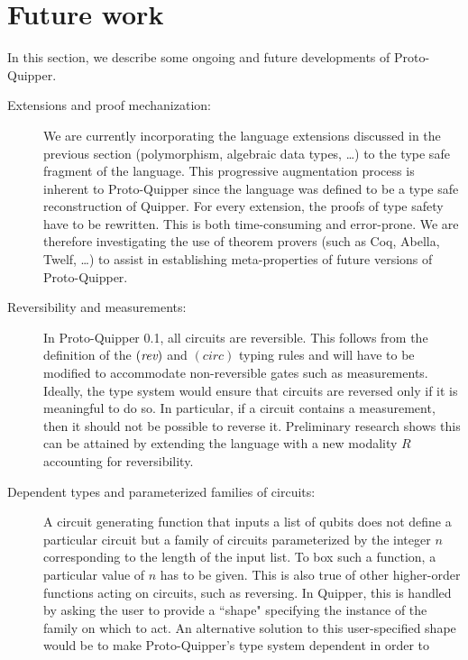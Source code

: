 \documentclass[twoside]{article}
\begin{document}
\clearpage
\section{Future work}

In this section, we describe some ongoing and future developments 
of Proto-Quipper.
\begin{description}
  \item[Extensions and proof mechanization:] We are 
    currently incorporating the language extensions discussed 
    in the previous section (polymorphism, algebraic data types, 
    \ldots) to the type safe fragment of the language. This 
    progressive augmentation process is inherent to Proto-Quipper 
    since the language was defined to be a type safe 
    reconstruction of Quipper. For every extension, the proofs 
    of type safety have to be rewritten. This is both time-consuming 
    and error-prone. We are therefore investigating the use 
    of theorem provers (such as Coq, Abella, Twelf, \ldots) to assist 
    in establishing meta-properties of future versions of 
    Proto-Quipper. 
  \item[Reversibility and measurements:] In Proto-Quipper 
    0.1, all circuits are reversible. This follows from the 
    definition of the $(\mathop{\textit{rev}}\nolimits)$ and $(circ)$ typing rules and will 
    have to be modified to accommodate non-reversible gates such 
    as measurements. Ideally, the type system would ensure that 
    circuits are reversed only if it is meaningful to do so. In 
    particular, if a circuit contains a measurement, then it 
    should not be possible to reverse it. Preliminary research 
    shows this can be attained by extending the language with a 
    new modality $R$ accounting for reversibility. 
  \item[Dependent types and parameterized families of circuits:] 
    A circuit generating function that inputs a list of qubits does not 
    define a particular circuit but a family of circuits parameterized 
    by the integer $n$ corresponding to the length of the input list.
    To box such a function, a particular value of $n$ has to be given. 
    This is also true of other higher-order functions acting on circuits, 
    such as reversing. In Quipper, this is handled by asking the user 
    to provide a ``shape" specifying the instance of the family on 
    which to act. An alternative solution to this user-specified shape 
    would be to make Proto-Quipper's type system dependent in order to 

\end{description}
\end{document}
